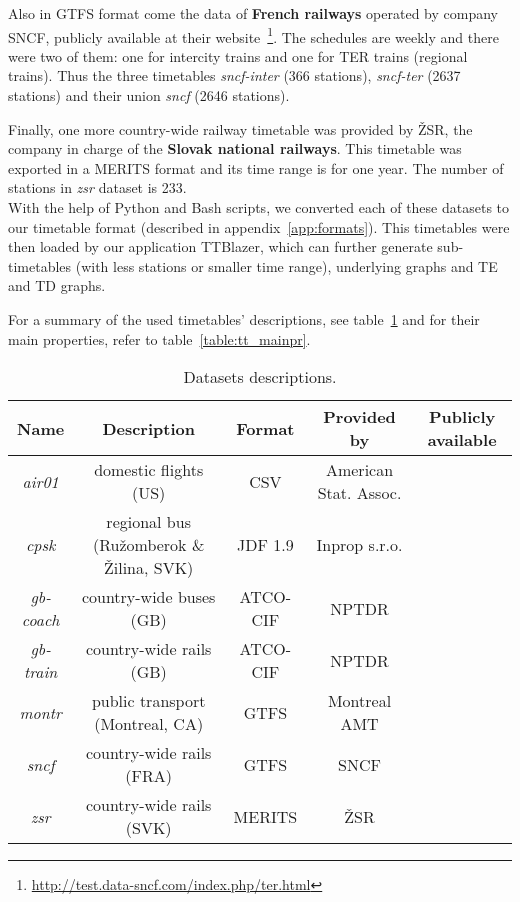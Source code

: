 	Also in GTFS format come the data of \textbf{French railways} operated by company SNCF, publicly available at their website~\footnote{\url{http://test.data-sncf.com/index.php/ter.html}}. The schedules are weekly and there were two of them: one for intercity trains and one for TER trains (regional trains). Thus the three timetables \textit{sncf-inter} (366 stations), \textit{sncf-ter} (2637 stations) and their union \textit{sncf} (2646 stations).
	
	Finally, one more country-wide railway timetable was provided by ŽSR, the company in charge of the \textbf{Slovak national railways}. This timetable was exported in a MERITS format and its time range is for one year. The number of stations in \textit{zsr} dataset is 233. \\
	
	\noindent With the help of Python and Bash scripts, we converted each of these datasets to our timetable format (described in appendix~\ref{app:formats}). This timetables were then loaded by our application TTBlazer, which can further generate sub-timetables (with less stations or smaller time range), underlying graphs and TE and TD graphs.
	
	For a summary of the used timetables' descriptions, see table~\ref{table:tt_desc} and for their main properties, refer to table~\ref{table:tt_mainpr}. \\
	
	\begin{table}[h!]
		\centering
		\footnotesize
		\begin{tabular}{c|c|c|c|c}
			\rowcolor{tablehead}
			\textbf{Name} & \textbf{Description} & \textbf{Format} & \textbf{Provided by} & \textbf{Publicly available} \\
			\hline
			\textit{air01} & domestic flights (US) & CSV & American Stat. Assoc. & \tick \\
			\textit{cpsk} & regional bus (Ružomberok \& Žilina, SVK) & JDF 1.9 & Inprop s.r.o. & \cross \\
			\textit{gb-coach} & country-wide buses (GB) & ATCO-CIF & NPTDR & \tick \\
			\textit{gb-train} & country-wide rails (GB) & ATCO-CIF & NPTDR & \tick \\
			\textit{montr} & public transport (Montreal, CA) & GTFS & Montreal AMT & \tick \\
			\textit{sncf} & country-wide rails (FRA) & GTFS & SNCF & \tick \\
			\textit{zsr} & country-wide rails (SVK) & MERITS & ŽSR & \cross \\
		\end{tabular}
		\caption{\label{table:tt_desc} Datasets descriptions.}
		\normalsize
	\end{table}		
	
